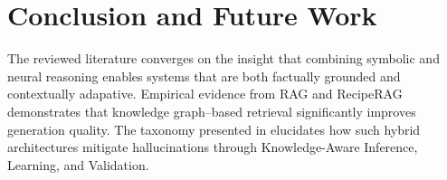 \documentclass[conference]{IEEEtran}
\begin{document}
\section{Conclusion and Future Work}

\noindent
The reviewed literature converges on the insight that combining symbolic and neural reasoning enables systems that are both factually grounded and contextually adapative.
Empirical evidence from RAG \cite{lewis2020rag} and RecipeRAG \cite{loesch2025reciperag} demonstrates that knowledge graph–based retrieval significantly improves generation quality. The taxonomy presented in \cite{agrawal2024kg_hallucinations} elucidates how such hybrid architectures mitigate hallucinations through Knowledge-Aware Inference, Learning, and Validation.



\end{document}
